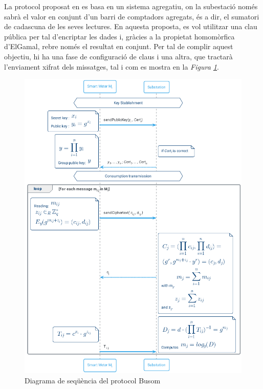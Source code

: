 

La protocol proposat en \cite{busom} es basa en un sistema agregatiu, on la subestació només sabrà el valor en conjunt d'un barri de comptadors agregats, és a dir, el sumatori de cadascuna de les seves lectures. En aquesta proposta, es vol utilitzar una clau pública per tal d'encriptar les dades i, gràcies a la propietat homomòrfica d'ElGamal, rebre només el resultat en conjunt. Per tal de complir aquest objectiu, hi ha una fase de configuració de claus i una altra, que tractarà l'enviament xifrat dels missatges, tal i com es mostra en la \textit{Figura \ref{fig:busom}}.
\begin{figure}[H]
	\centering
	\includegraphics[width=14cm]{umls/busom.png}
	\caption{Diagrama de seqüència del protocol Busom}
	\label{fig:busom}
\end{figure}

